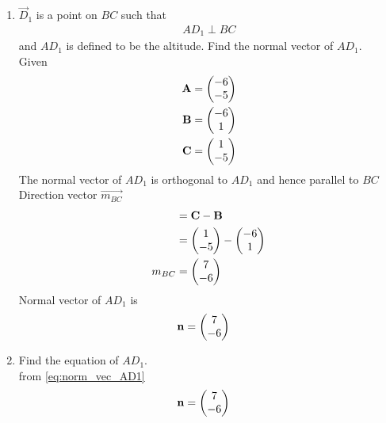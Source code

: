 \documentclass[11pt]{book}
\begin{document}
\begin{enumerate}[label=\thesection.\arabic*.,ref=\thesection.\theenumi]

\item $\vec{D}_1$ is a point on $BC$ such that
\begin{align}
AD_1 \perp BC
\end{align}
and $AD_1$ is defined to be the altitude. Find the normal vector of $AD_1$.
  \\   \solution Given  \\
  \begin{align} 
 \mathbf{A} &= \begin{pmatrix} -6\\ -5 \end{pmatrix} \\
 \mathbf{B} &= \begin{pmatrix} -6\\ 1 \end{pmatrix}\\
 \mathbf{C} &= \begin{pmatrix} 1\\ -5\end{pmatrix}
 \end{align}
The normal vector of $AD_{1}$ is orthogonal to $AD_1$ and hence parallel to $BC$ \\ Direction vector $\vec{m_{BC}}$ 
\begin{align}
    &=\mathbf{C}-\mathbf{B}\\
    &=\begin{pmatrix}1 \\ -5\end{pmatrix} -\begin{pmatrix}-6 \\1\end{pmatrix} \\
    m_{BC} &= \begin{pmatrix}7 \\ -6\end{pmatrix}
\end{align}
Normal vector of $AD_1$ is
\begin{align}
\label{eq:norm_vec_AD1}
	\vec{n} &= 
\myvec{7\\-6}
\end{align}

\item Find the equation of $AD_1$.
 \\    \solution from \eqref{eq:norm_vec_AD1} 
 \begin{align}
	\mathbf{n} &= 
\begin{pmatrix}7\\-6\end{pmatrix}
\end{align}


\end{enumerate}
\end{document}
